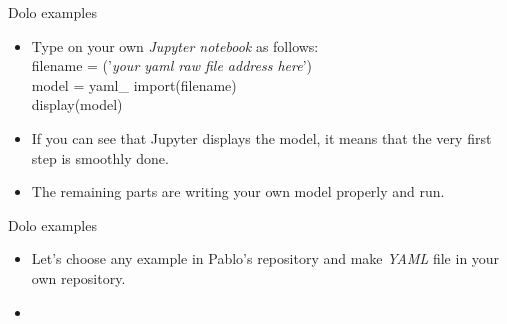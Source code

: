 \documentclass{beamer}
\begin{document}
\begin{frame}{Dolo examples}
\begin{itemize}
  
    \item Type on your own \textit{Jupyter notebook} as follows:\\
    
    filename = ('\textit{your yaml raw file address here}')\\
    model = yaml\_ import(filename)\\
    display(model)  

\item If you can see that Jupyter displays the model, it means that the very first step is smoothly done. 
\item The remaining parts are writing your own model properly and run. 
\end{itemize}
\end{frame}
\begin{frame}{Dolo examples}
    \begin{itemize}
        \item Let's choose any example in Pablo's repository and make \textit{YAML} file in your own repository. 
        \item 
    \end{itemize}
\end{frame}
\end{document}
